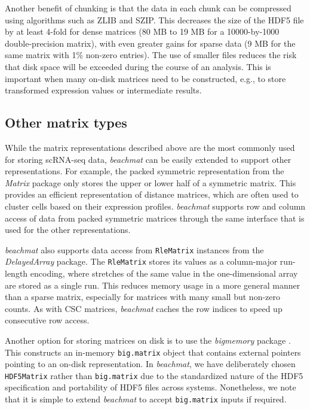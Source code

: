 \documentclass{article}
\newcommand{\beachmat}{\textit{beachmat}}
\newcommand{\code}[1]{\texttt{#1}}
\begin{document}
Another benefit of chunking is that the data in each chunk can be compressed using algorithms such as ZLIB and SZIP.
This decreases the size of the HDF5 file by at least 4-fold for dense matrices (80 MB to 19 MB for a 10000-by-1000 double-precision matrix), with even greater gains for sparse data (9 MB for the same matrix with 1\% non-zero entries).
The use of smaller files reduces the risk that disk space will be exceeded during the course of an analysis.
This is important when many on-disk matrices need to be constructed, e.g., to store transformed expression values or intermediate results.

\subsection{Other matrix types}
While the matrix representations described above are the most commonly used for storing scRNA-seq data, \beachmat{} can be easily extended to support other representations.
For example, the packed symmetric representation from the \textit{Matrix} package only stores the upper or lower half of a symmetric matrix.
This provides an efficient representation of distance matrices, which are often used to cluster cells based on their expression profiles.
\beachmat{} supports row and column access of data from packed symmetric matrices through the same interface that is used for the other representations.

\beachmat{} also supports data access from \code{RleMatrix} instances from the \textit{DelayedArray} package.
The \code{RleMatrix} stores its values as a column-major run-length encoding, where stretches of the same value in the one-dimensional array are stored as a single run.
This reduces memory usage in a more general manner than a sparse matrix, especially for matrices with many small but non-zero counts.
As with CSC matrices, \beachmat{} caches the row indices to speed up consecutive row access.

Another option for storing matrices on disk is to use the \textit{bigmemory} package \cite{kane2013scalable}.
This constructs an in-memory \code{big.matrix} object that contains external pointers pointing to an on-disk representation.
In \beachmat{}, we have deliberately chosen \code{HDF5Matrix} rather than \code{big.matrix} due to the standardized nature of the HDF5 specification and portability of HDF5 files across systems.
Nonetheless, we note that it is simple to extend \beachmat{} to accept \code{big.matrix} inputs if required.
\end{document}

